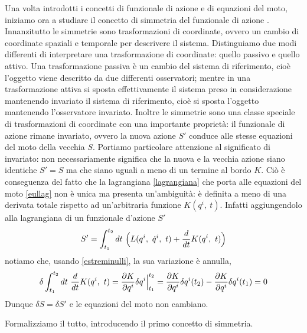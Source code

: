     Una volta introdotti i concetti di funzionale di azione e di equazioni del moto, iniziamo ora a studiare il concetto di simmetria del funzionale di azione \cite[Capitolo 2]{banados}. Innanzitutto le simmetrie sono trasformazioni di coordinate, ovvero un cambio di coordinate spaziali e temporale per descrivere il sistema. Distinguiamo due modi differenti di interpretare una trasformazione di coordinate: quello passivo e quello attivo. Una trasformazione passiva è un cambio del sistema di riferimento, cioè l'oggetto viene descritto da due differenti osservatori; mentre in una trasformazione attiva si sposta effettivamente il sistema preso in considerazione mantenendo invariato il sistema di riferimento, cioè si sposta l'oggetto mantenendo l'osservatore invariato. Inoltre le simmetrie sono una classe speciale di trasformazioni di coordinate con una importante proprietà: il funzionale di azione rimane invariato, ovvero la nuova azione $S'$ conduce alle stesse equazioni del moto della vecchia $S$. Portiamo particolare attenzione al significato di invariato: non necessariamente significa che la nuova e la vecchia azione siano identiche $S' = S$ ma che siano uguali a meno di un termine al bordo $K$. Ciò è conseguenza del fatto che la lagrangiana \eqref{lagrangiana} che porta alle equazioni del moto \eqref{eullag} non è unica ma presenta un'ambiguità: è definita a meno di una derivata totale rispetto ad un'arbitraria funzione $K(q^i, ~ t)$. Infatti aggiungendolo alla lagrangiana di un funzionale d'azione $S'$
    \begin{equation*}
        S' = \int_{t_1}^{t_2}dt~ \Big ( L(q^i, ~ \dot q^i, ~t) + \frac{d}{dt} K(q^i, ~t) \Big)
    \end{equation*}
    notiamo che, usando \eqref{estreminulli}, la sua variazione è annulla,
    \begin{equation*}
        \delta \int_{t_1}^{t_2}dt~ \frac{d}{dt} K(q^i, ~t) = \frac{\partial K}{\partial q^i} \delta q^i \Big \vert_{t_1}^{t_2} = \frac{\partial K}{\partial q^i} \delta q^i (t_2) - \frac{\partial K}{\partial q^i} \delta q^i (t_1) = 0
    \end{equation*} 
    Dunque $\delta S = \delta S'$ e le equazioni del moto non cambiano.

    Formalizziamo il tutto, introducendo il primo concetto di simmetria.

